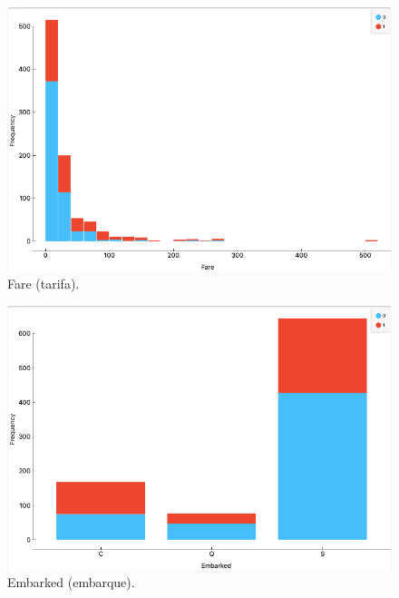 \begin{figure}[ht]
	\includegraphics[scale=0.4]{images/6}
	\centering 
	\caption{Fare (tarifa).}
\end{figure}
\begin{figure}[ht]
	\includegraphics[scale=0.4]{images/7}
	\centering 
	\caption{Embarked (embarque).}
\end{figure}
%
%

